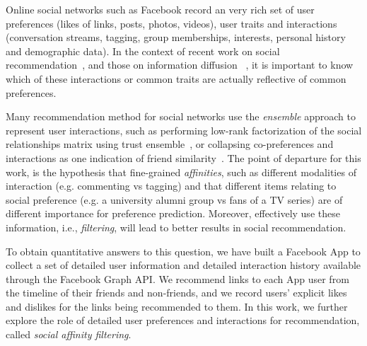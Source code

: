 
\label{sec:introduction}

Online social networks such as Facebook record an very rich set of user
preferences  (likes of links, posts, photos, videos), user traits
and interactions (conversation streams, tagging, group memberships,
interests, personal history and demographic data).  In the context of
 recent work on social recommendation~\cite{sorec,ste,lla}, and those on 
information diffusion %
~\cite{Goel2012structure,Romero2011hashtag,Bakshy2012chamber}, 
it is important to know which of these interactions or common traits
are actually reflective of common preferences.

Many recommendation method for social networks 
use the {\em ensemble} approach to represent 
user interactions, such as performing 
low-rank factorization of the social relationships matrix\cite{sorec} 
using trust ensemble~\cite{ste},
or collapsing co-preferences and interactions as 
one indication of friend similarity~\cite{Noel2012NOF}.
The point of departure for this work, is the hypothesis that
fine-grained {\em affinities}, such as
different modalities of interaction (e.g. commenting vs tagging) 
and that different items relating to social preference 
(e.g. a university alumni group vs fans of a TV series) 
are of different importance for preference prediction. 
Moreover, effectively use these information, i.e., {\em filtering}, 
will lead to better results in social recommendation.

To obtain quantitative answers to this question, 
we have built a Facebook App to collect a set of 
detailed user information and detailed interaction history 
available through the Facebook Graph API. 
We recommend links to each App user from the timeline of their 
friends and non-friends, and we record users' explicit likes 
and dislikes for the links being recommended to them. 
In this work, we further explore the role of detailed user preferences 
and interactions for recommendation, called {\em social affinity filtering}.

